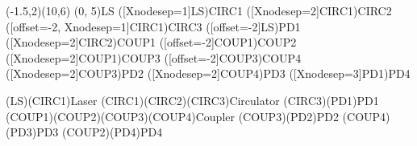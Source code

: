 \documentclass[pstricks]{standalone}
\begin{document}
	\begin{pspicture}(-1.5,2)(10,6)
        \pnode(0, 5){LS}
        \pnode([Xnodesep=1]LS){CIRC1}
        \pnode([Xnodesep=2]CIRC1){CIRC2}
        \pnode([offset=-2, Xnodesep=1]CIRC1){CIRC3}
        \pnode([offset=-2]LS){PD1}
        \pnode([Xnodesep=2]CIRC2){COUP1}
        \pnode([offset=-2]COUP1){COUP2}
        \pnode([Xnodesep=2]COUP1){COUP3}
        \pnode([offset=-2]COUP3){COUP4}
        \pnode([Xnodesep=2]COUP3){PD2}
        \pnode([Xnodesep=2]COUP4){PD3}
        \pnode([Xnodesep=3]PD1){PD4}
        \begin{optexp}
            \optsource[compname=LS, innerlabel](LS)(CIRC1){Laser}
            \optcirculator[compname=CIRC](CIRC1)(CIRC2)(CIRC3){Circulator}
            \optdetector[compname=PD1](CIRC3)(PD1){PD1}
            \optcoupler(COUP1)(COUP2)(COUP3)(COUP4){Coupler}
            \optdetector[compname=PD2](COUP3)(PD2){PD2}
            \optdetector[compname=PD3](COUP4)(PD3){PD3}
            \optdetector[compname=PD4](COUP2)(PD4){PD4}
        \end{optexp}
    \end{pspicture}
\end{document}

